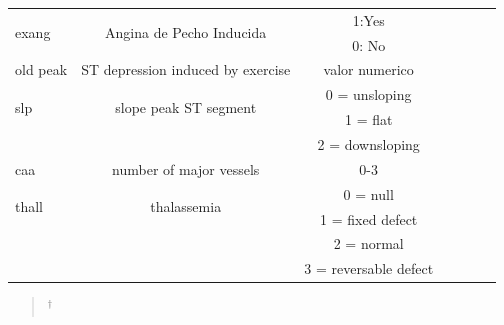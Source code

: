 \documentclass[10pt,journal]{IEEEtran}
\begin{document}
\begin{table}[th]
{\begin{tabular}{p{1.2cm} c c c p{2cm} c c }
\multirow{2}{2cm}{exang} & \multirow{2}{2cm}{Angina de Pecho Inducida} & 1:Yes \\ & & 0: No  \\\hline

old peak & ST depression induced by exercise & valor numerico \\\hline

\multirow{2}{2cm}{slp} & \multirow{2}{2cm}{slope peak ST segment} & 0 = unsloping \\ & & 1 = flat \\ & & 2 = downsloping\\\hline


caa & number of major vessels &  0-3 \\\hline




\multirow{2}{2cm}{thall } & \multirow{2}{2cm}{thalassemia} & 0 = null \\ & & 1 = fixed defect \\ & & 2 = normal \\ & & 3 = reversable defect\\\hline



\bottomrule
\end{tabular}%
}
\begin{quote}
\scriptsize
\centering
$^{\dagger}$ 
\end{quote}
\end{table}

 

\ifCLASSOPTIONcaptionsoff
  \newpage
\fi







~\cite{articlePredictingFuzzyCMeans}
~\cite{inbookClusteringAndAsociationRules}
~\cite{fusterbarcel_2023_unleashing}
~\cite{emmanuelramos143FeatureSelection}
~\cite{stephenallwright_2022}

%
\end{document}
